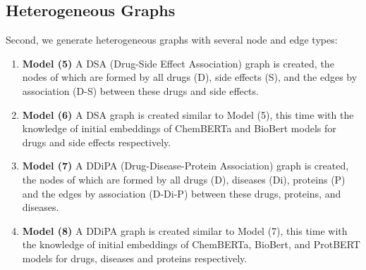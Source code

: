 \subsection{Heterogeneous Graphs}
Second, we generate heterogeneous graphs with several node and edge types:
\begin{enumerate}
    \item \textbf{Model (5)} A DSA (Drug-Side Effect Association) graph is created, the nodes of which are formed by all drugs (D), side effects (S), and the edges by association (D-S) between these drugs and side effects.  
    \item \textbf{Model (6)} A DSA graph is created similar to Model (5), this time with the knowledge of initial embeddings of ChemBERTa and BioBert models for drugs and side effects respectively. 
    \item \textbf{Model (7)} A DDiPA (Drug-Disease-Protein Association) graph is created, the nodes of which are formed by all drugs (D), diseases (Di), proteins (P) and the edges by association (D-Di-P) between these drugs, proteins, and diseases.  
    \item \textbf{Model (8)} A DDiPA graph is created similar to Model (7), this time with the knowledge of initial embeddings of ChemBERTa, BioBert, and ProtBERT models for drugs, diseases and proteins respectively. 
\end{enumerate}




